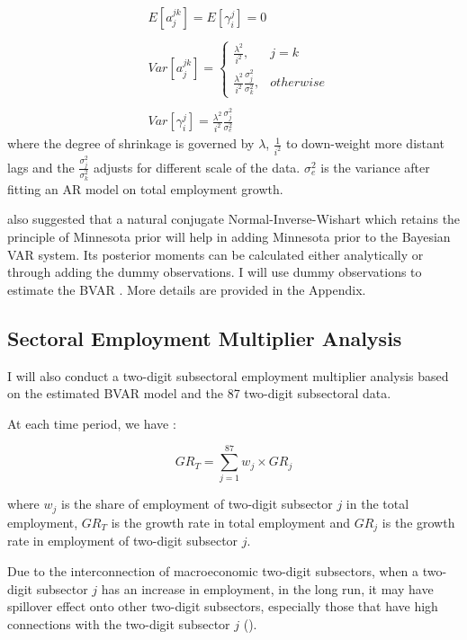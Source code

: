 \documentclass[11pt,a4paper,]{article}
\begin{document}
\[
\begin{aligned}\label{eq:1}
&E[a_{j}^{jk}] = E[\gamma_{i}^j]=0\\
\\
&Var[a_j^{jk}]= 
\begin{cases}
\frac{\lambda^2}{i^2},&j=k\\
\frac{\lambda^2}{i^2}\frac{\sigma^2_{j}}{\sigma^2_k},& otherwise
\end{cases}\\
\\
&Var[\gamma_i^{j}]=\frac{\lambda^2}{i^2}\frac{\sigma^2_{j}}{\sigma^2_e}
\end{aligned}
\]
where the degree of shrinkage is governed by \(\lambda\), \(\frac{1}{i^2}\) to down-weight more distant lags and the \(\frac{\sigma_j^2}{\sigma_k^2}\) adjusts for different scale of the data. \(\sigma^2_e\) is the variance after fitting an AR model on total employment growth.

\textcite{banbura2010large} also suggested that a natural conjugate Normal-Inverse-Wishart which retains the principle of Minnesota prior will help in adding Minnesota prior to the Bayesian VAR system. Its posterior moments can be calculated either analytically or through adding the dummy observations. I will use dummy observations to estimate the BVAR \autocites[e.g.][]{banbura2010large,anderson2020,wozniak2016bayesian}. More details are provided in the Appendix.

\hypertarget{sectoral-employment-multiplier-analysis}{%
\subsection{Sectoral Employment Multiplier Analysis}\label{sectoral-employment-multiplier-analysis}}

I will also conduct a two-digit subsectoral employment multiplier analysis based on the estimated BVAR model and the 87 two-digit subsectoral data.

At each time period, we have :

\[
GR_T=\sum_{j=1}^{87} w_j\times {GR}_j
\]

where \(w_j\) is the share of employment of two-digit subsector \(j\) in the total employment, \(GR_T\) is the growth rate in total employment and \(GR_j\) is the growth rate in employment of two-digit subsector \(j\).

Due to the interconnection of macroeconomic two-digit subsectors, when a two-digit subsector \(j\) has an increase in employment, in the long run, it may have spillover effect onto other two-digit subsectors, especially those that have high connections with the two-digit subsector \(j\) (\textcite{anderson2020}).
\end{document}
